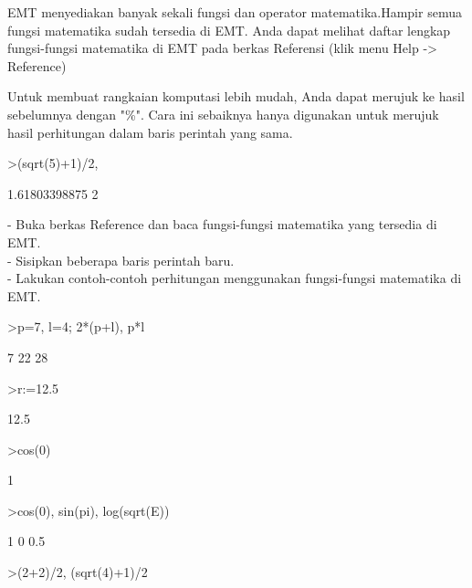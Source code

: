 \documentclass[12pt,Times new roman,letterpaper]{book}
\begin{document}
\begin{eulernootebook}
\begin{eulercomment}
\begin{eulercomment}
\begin{eulercomment}
EMT menyediakan banyak sekali fungsi dan operator matematika.Hampir semua fungsi
matematika sudah tersedia di EMT. Anda dapat melihat daftar lengkap fungsi-fungsi
matematika di EMT pada berkas Referensi (klik menu Help -\textgreater{} Reference)

Untuk membuat rangkaian komputasi lebih mudah, Anda dapat merujuk ke hasil
sebelumnya dengan "\%". Cara ini sebaiknya hanya digunakan untuk merujuk hasil
perhitungan dalam baris perintah yang sama.
\end{eulercomment}
\begin{eulerprompt}
>(sqrt(5)+1)/2, %
\end{eulerprompt}
\begin{euleroutput}
  1.61803398875
  2
\end{euleroutput}
\begin{eulercomment}
- Buka berkas Reference dan baca fungsi-fungsi matematika yang
tersedia di EMT.\\
- Sisipkan beberapa baris perintah baru.\\
- Lakukan contoh-contoh perhitungan menggunakan fungsi-fungsi
matematika di EMT.\\
\end{eulercomment}
\eulersubheading{}
\begin{eulerprompt}
>p=7, l=4; 2*(p+l), p*l
\end{eulerprompt}
\begin{euleroutput}
  7
  22
  28
\end{euleroutput}
\begin{eulerprompt}
>r:=12.5
\end{eulerprompt}
\begin{euleroutput}
  12.5
\end{euleroutput}
\begin{eulerprompt}
>cos(0)
\end{eulerprompt}
\begin{euleroutput}
  1
\end{euleroutput}
\begin{eulerprompt}
>cos(0), sin(pi), log(sqrt(E))
\end{eulerprompt}
\begin{euleroutput}
  1
  0
  0.5
\end{euleroutput}
\begin{eulerprompt}
>(2+2)/2, (sqrt(4)+1)/2
\end{eulerprompt}
\begin{euleroutput}

\end{euleroutput}
\end{eulercomment}
\end{eulercomment}
\end{eulernootebook}
\end{document}
